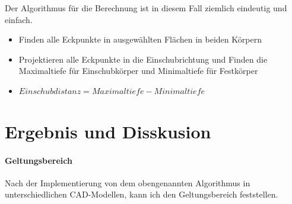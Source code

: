 \documentclass[14pt,a4paper,titlepage]{article}
\begin{document}
	 	Der Algorithmus für die Berechnung ist in diesem Fall ziemlich eindeutig und einfach.
	 		\begin{itemize}
	 			\item Finden alle Eckpunkte in ausgewählten Flächen in beiden Körpern
	 			\item Projektieren alle Eckpunkte in die Einschubrichtung und Finden die Maximaltiefe für Einschubkörper und Minimaltiefe für Festkörper
	 			\item \(Einschubdistanz = Maximaltiefe - Minimaltiefe\)
	 		\end{itemize}
	\section{Ergebnis und Disskusion}
		\paragraph{Geltungsbereich}
		Nach der Implementierung von dem obengenannten Algorithmus in unterschiedlichen CAD-Modellen, kann ich den Geltungsbereich feststellen.  
\end{document}
